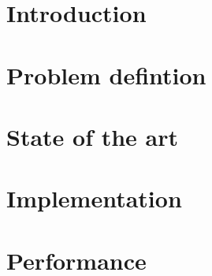 






\chapter{Introduction}


\chapter{Problem defintion}


\chapter{State of the art}


\chapter{Implementation}


\chapter{Performance}



 

\appendix




